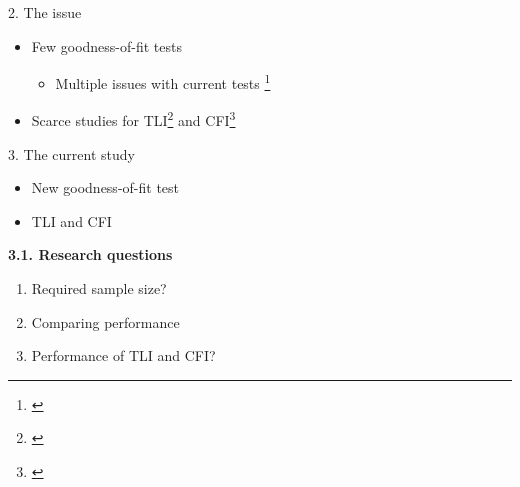 \documentclass[aspectratio=169]{beamer}
\begin{document}
\begin{frame}{2. The issue}


\vspace{1cm}

\begin{itemize}
	\item{Few goodness-of-fit tests}
		\begin{itemize}
			\item{Multiple issues with current tests \footnote[frame]{\cite{chi2sens, 4plconsist1}}}
		\end{itemize}
	\item{Scarce studies for TLI\footnote[frame]{\cite{tli}} and CFI\footnote[frame]{\cite{cfi}}}
\end{itemize}

\end{frame}

\begin{frame}{3. The current study}

\begin{itemize}
	\item{New goodness-of-fit test}
	\item{TLI and CFI}
\end{itemize}

\vspace{1cm}


\begin{block}{\textbf{3.1. Research questions}}

\begin{enumerate}[<+(1)->]
	\item{Required sample size?}
	\item{Comparing performance}
	\item{Performance of TLI and CFI?}
\end{enumerate}

\end{block}

\end{frame}
\end{document}
